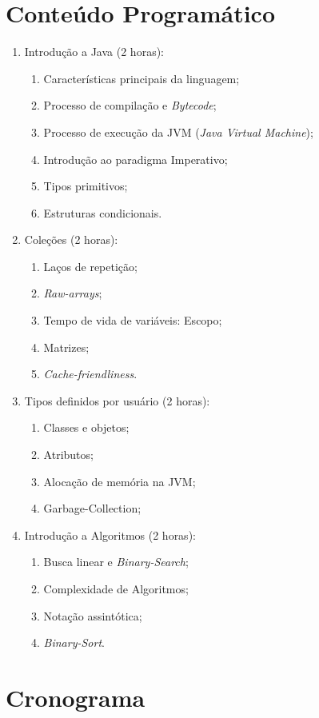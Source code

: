 \documentclass{article}
\begin{document}
\section{Conteúdo Programático}

\begin{enumerate}
    \item Introdução a Java (2 horas):
        \begin{enumerate}
            \item Características principais da linguagem;
            \item Processo de compilação e \textit{Bytecode};
            \item Processo de execução da JVM (\textit{Java Virtual Machine});
            \item Introdução ao paradigma Imperativo;
            \item Tipos primitivos;
            \item Estruturas condicionais.
        \end{enumerate}
    \item Coleções (2 horas):
        \begin{enumerate}
            \item Laços de repetição;
            \item \textit{Raw-arrays};
            \item Tempo de vida de variáveis: Escopo;
            \item Matrizes;
            \item \textit{Cache-friendliness}.
        \end{enumerate}
    \item Tipos definidos por usuário (2 horas):
        \begin{enumerate}
            \item Classes e objetos;
            \item Atributos;
            \item Alocação de memória na JVM;
            \item Garbage-Collection;
        \end{enumerate}
    \item Introdução a Algoritmos (2 horas):
        \begin{enumerate}
            \item Busca linear e \textit{Binary-Search};
            \item Complexidade de Algoritmos;
            \item Notação assintótica;
            \item \textit{Binary-Sort}.
        \end{enumerate}
\end{enumerate}

\section{Cronograma}

\nocite{*}


\end{document}
